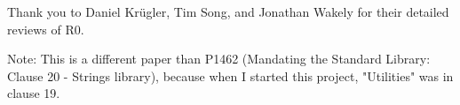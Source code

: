 Thank you to Daniel Krügler, Tim Song, and Jonathan Wakely for their detailed reviews of R0.

Note: This is a different paper than P1462 (Mandating the Standard Library: Clause 20 - Strings library),
because when I started this project, "Utilities" was in clause 19.


%
%
